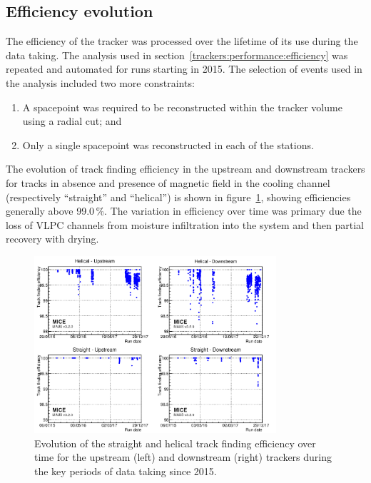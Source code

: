 \subsection{Efficiency evolution}

The efficiency of the tracker was processed over the lifetime of its use during the data taking. The analysis used in section~\ref{trackers:performance:efficiency} was repeated and automated for runs starting in 2015.
The selection of events used in the analysis included two more constraints:
\begin{enumerate}
  \item A spacepoint was required to be reconstructed within the tracker volume using a radial cut; and
  \item Only a single spacepoint was reconstructed in each of the stations.
\end{enumerate}

The evolution of track finding efficiency in the upstream and downstream trackers for tracks in absence and presence of magnetic field in the cooling channel (respectively ``straight'' and ``helical'') is shown in figure~\ref{fig:trackers:performance:historical}, showing efficiencies generally above 99.0\,\%. The variation in efficiency over time was primary due the loss of VLPC channels from moisture infiltration into the system and then partial recovery with drying.


\begin{figure}
  \centering
  \includegraphics[width=0.80\textwidth]{historical_analysis_plot_logo.png}
  \caption{\label{fig:trackers:performance:historical} Evolution of the straight and helical track finding efficiency over time for the upstream (left) and downstream (right) trackers during the key periods of data taking since 2015.}
\end{figure}

